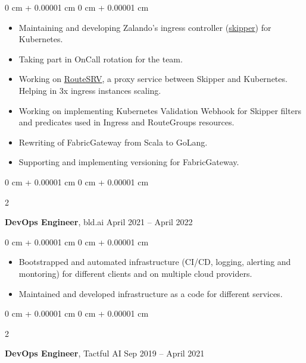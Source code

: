\documentclass[10pt, letterpaper]{article}
\newenvironment{highlights}{
    \begin{itemize}[
        topsep=0.10 cm,
        parsep=0.10 cm,
        partopsep=0pt,
        itemsep=0pt,
        leftmargin=0 cm + 10pt
    ]
}{
    \end{itemize}
} %
\newenvironment{onecolentry}{
    \begin{adjustwidth}{
        0 cm + 0.00001 cm
    }{
        0 cm + 0.00001 cm
    }
}{
    \end{adjustwidth}
} %
\newenvironment{twocolentry}[2][]{
    \onecolentry
    \def\secondColumn{#2}
    \setcolumnwidth{\fill, 4.5 cm}
    \begin{paracol}{2}
}{
    \switchcolumn \raggedleft \secondColumn
    \end{paracol}
    \endonecolentry
} %
\begin{document}
        \vspace{0.10 cm}
        \begin{onecolentry}
            \begin{highlights}
                \item Maintaining and developing Zalando's ingress controller (\href{https://github.com/zalando/skipper}{skipper}) for Kubernetes.
                \item Taking part in OnCall rotation for the team.
                \item Working on \href{https://engineering.zalando.com/posts/2025/02/scaling-beyond-limits-harnessing-route-server-for-a-stable-cluster.html}{RouteSRV}, a proxy service between Skipper and Kubernetes.
                Helping in 3x ingress instances scaling. 
                \item Working on implementing Kubernetes Validation Webhook for Skipper filters and predicates used in Ingress and RouteGroups resources.
                \item Rewriting of FabricGateway from Scala to GoLang.
                \item Supporting and implementing versioning for FabricGateway.
            \end{highlights}
        \end{onecolentry}
        \vspace{0.2 cm}

        \begin{twocolentry}{
            April 2021 – April 2022
        }
            \textbf{DevOps Engineer}, bld.ai\end{twocolentry}

        \vspace{0.10 cm}
        \begin{onecolentry}
            \begin{highlights}
                \item Bootstrapped and automated infrastructure (CI/CD, logging, alerting and montoring) for different clients and on multiple cloud providers. 
                \item Maintained and developed infrastructure as a code for different services.
            \end{highlights}
        \end{onecolentry}
        
        \begin{twocolentry}{
            Sep 2019 – April 2021
        }
            \textbf{DevOps Engineer}, Tactful AI\end{twocolentry}
\end{document}
